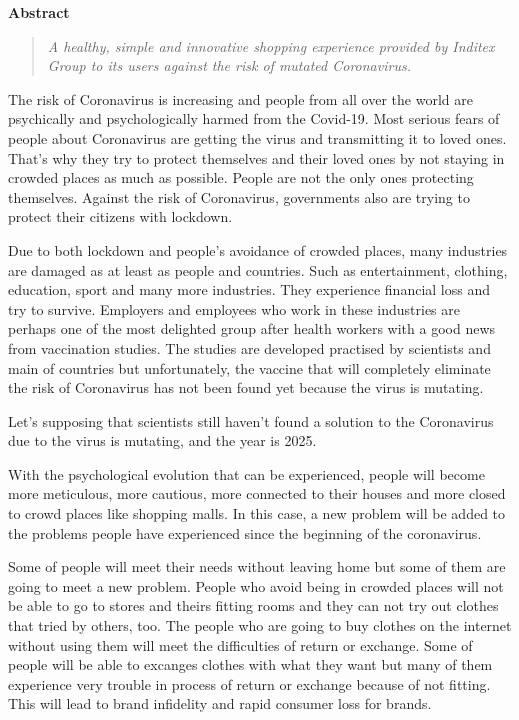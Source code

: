 \documentclass[]{book}
\begin{document}
\textbf{Abstract}

\begin{quote}
\emph{A healthy, simple and innovative shopping experience provided by Inditex Group to its users against the risk of mutated Coronavirus.}
\end{quote}

The risk of Coronavirus is increasing and people from all over the world are psychically and psychologically harmed from the Covid-19. Most serious fears of people about Coronavirus are getting the virus and transmitting it to loved ones. That's why they try to protect themselves and their loved ones by not staying in crowded places as much as possible. People are not the only ones protecting themselves. Against the risk of Coronavirus, governments also are trying to protect their citizens with lockdown.

Due to both lockdown and people's avoidance of crowded places, many industries are damaged as at least as people and countries. Such as entertainment, clothing, education, sport and many more industries. They experience financial loss and try to survive. Employers and employees who work in these industries are perhaps one of the most delighted group after health workers with a good news from vaccination studies. The studies are developed practised by scientists and main of countries but unfortunately, the vaccine that will completely eliminate the risk of Coronavirus has not been found yet because the virus is mutating.

Let's supposing that scientists still haven't found a solution to the Coronavirus due to the virus is mutating, and the year is 2025.

With the psychological evolution that can be experienced, people will become more meticulous, more cautious, more connected to their houses and more closed to crowd places like shopping malls. In this case, a new problem will be added to the problems people have experienced since the beginning of the coronavirus.

Some of people will meet their needs without leaving home but some of them are going to meet a new problem. People who avoid being in crowded places will not be able to go to stores and theirs fitting rooms and they can not try out clothes that tried by others, too. The people who are going to buy clothes on the internet without using them will meet the difficulties of return or exchange. Some of people will be able to excanges clothes with what they want but many of them experience very trouble in process of return or exchange because of not fitting. This will lead to brand infidelity and rapid consumer loss for brands.
\end{document}
